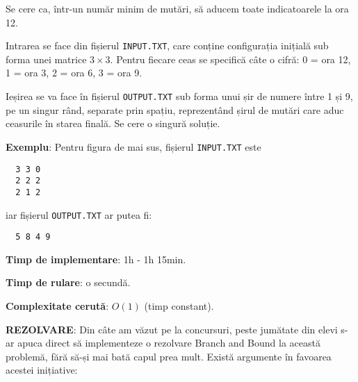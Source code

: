 Se cere ca, într-un număr minim de mutări, să aducem toate indicatoarele la
ora 12.

Intrarea se face din fișierul {\tt INPUT.TXT}, care conține configurația
inițială sub forma unei matrice $3 \times 3$. Pentru fiecare ceas se specifică
câte o cifră: 0 = ora 12, 1 = ora 3, 2 = ora 6, 3 = ora 9.

Ieșirea se va face în fișierul {\tt OUTPUT.TXT} sub forma unui șir de numere
între 1 și 9, pe un singur rând, separate prin spațiu, reprezentând șirul de
mutări care aduc ceasurile în starea finală. Se cere o singură soluție.

{\bf Exemplu}: Pentru figura de mai sus, fișierul {\tt INPUT.TXT} este

\begin{verbatim}
  3 3 0
  2 2 2
  2 1 2
\end{verbatim}

iar fișierul {\tt OUTPUT.TXT} ar putea fi:

\begin{verbatim}
  5 8 4 9
\end{verbatim}

{\bf Timp de implementare}: 1h - 1h 15min.

{\bf Timp de rulare}: o secundă.

{\bf Complexitate cerută}: $O(1)$ (timp constant).

{\bf REZOLVARE}: Din câte am văzut pe la concursuri, peste jumătate din elevi
s-ar apuca direct să implementeze o rezolvare Branch and Bound la această
problemă, fără să-și mai bată capul prea mult. Există argumente în favoarea
acestei inițiative:

